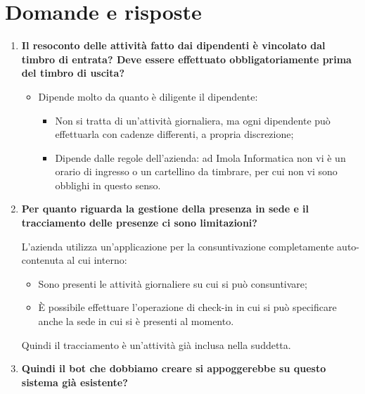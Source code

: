 \documentclass[11pt]{article}
\begin{document}
	\section{Domande e risposte}
		\begin{enumerate}
			\item \textbf{Il resoconto delle attività fatto dai dipendenti è vincolato dal timbro di entrata? Deve
			essere effettuato obbligatoriamente prima del timbro di uscita?}
			
			\medskip
			
			\begin{itemize}
				\item Dipende molto da quanto è diligente il dipendente:
				\begin{itemize}
					\item Non si tratta di un'attività giornaliera, ma ogni dipendente può effettuarla con cadenze differenti,
					a propria discrezione;
					\item Dipende dalle regole dell'azienda: ad Imola Informatica non vi è un orario di ingresso o un cartellino
					da timbrare, per cui non vi sono obblighi in questo senso.
				\end{itemize}
			\end{itemize}

			\bigskip
			
			\item \textbf{Per quanto riguarda la gestione della presenza in sede e il tracciamento delle presenze ci sono
			limitazioni?}
			
			\medskip
			
			L'azienda utilizza un'applicazione per la consuntivazione completamente auto-contenuta al cui interno:
			\begin{itemize}
				\item Sono presenti le attività giornaliere su cui si può consuntivare;
				\item È possibile effettuare l'operazione di check-in in cui si può specificare anche la sede in cui
				si è presenti al momento.
			\end{itemize}
			Quindi il tracciamento è un'attività già inclusa nella suddetta.
			
			\bigskip 
			
			\item \textbf{Quindi il bot che dobbiamo creare si appoggerebbe su questo sistema già esistente?}
			
			\medskip
			

\end{enumerate}
\end{document}
